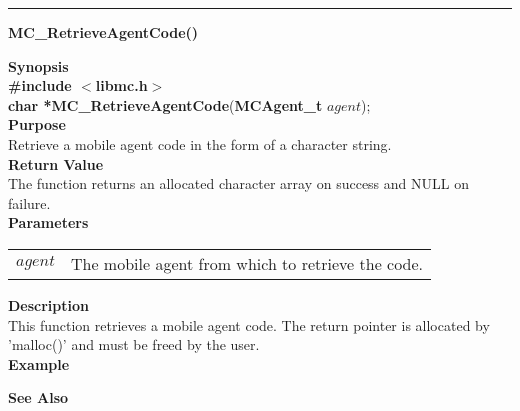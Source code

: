 \noindent
\vspace{5pt}
\rule{6.5in}{0.015in}
\noindent
{\LARGE \bf MC\_RetrieveAgentCode()}\\
{}
\label{api:MC_RetrieveAgentCode()}

\noindent
{\bf Synopsis}\\
{\bf \#include $<$libmc.h$>$}\\
{\bf char *MC\_RetrieveAgentCode}({\bf MCAgent\_t} $agent$);\\

\noindent
{\bf Purpose}\\
Retrieve a mobile agent code in the form of a character string.\\

\noindent
{\bf Return Value}\\
The function returns an allocated character array on success and NULL on 
failure.\\

\noindent
{\bf Parameters}
\vspace{-0.1in}
\begin{description}
\item               
\begin{tabular}{p{10 mm}p{145 mm}}
$agent$ & The mobile agent from which to retrieve the code.
\end{tabular}
\end{description}

\noindent
{\bf Description}\\
This function retrieves a mobile agent code. 
The return pointer is allocated by 'malloc()' and must be freed by the user.\\

\noindent
{\bf Example}\\
\noindent
{\footnotesize}

\noindent
{\bf See Also}\\

